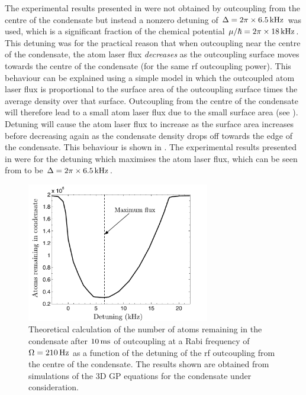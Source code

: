 The experimental results presented in  were not obtained by outcoupling from the centre of the condensate but instead a nonzero detuning of $\Delta = 2 \pi \times \unit[6.5]{kHz}$ was used, which is a significant fraction of the chemical potential $\mu/\hbar = 2\pi \times \unit[18]{kHz}$. This detuning was for the practical reason that when outcoupling near the centre of the condensate, the atom laser flux \emph{decreases} as the outcoupling surface moves towards the centre of the condensate (for the same rf outcoupling power). This behaviour can be explained using a simple model in which the  outcoupled atom laser flux is proportional to the surface area of the outcoupling surface times the average density over that surface. Outcoupling from the centre of the condensate will therefore lead to a small atom laser flux due to the small surface area (see ). Detuning will cause the atom laser flux to increase as the surface area increases before decreasing again as the condensate density drops off towards the edge of the condensate. This behaviour is shown in . The experimental results presented in  were for the detuning which maximises the atom laser flux, which can be seen from  to be $\Delta = 2\pi \times \unit[6.5]{kHz}$.

\begin{figure}
    \centering
    \includegraphics[width=8cm]{DetuningCurve}
    \caption{Theoretical calculation of the number of atoms remaining in the condensate after $\unit[10]{ms}$ of outcoupling at a Rabi frequency of $\Omega = \unit[210]{Hz}$ as a function of the detuning of the rf outcoupling from the centre of the condensate. The results shown are obtained from simulations of the 3D GP equations for the condensate under consideration. \label{Peaks:DetuningCurve}}
\end{figure}

